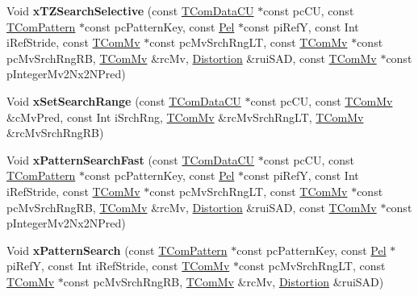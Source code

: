 \begin{DoxyCompactItemize}
\item 
\mbox{\label{class_t_enc_search_acf9bc4cb8abd7f24b58e17d54b583603}} 
Void {\bfseries x\+T\+Z\+Search\+Selective} (const \hyperlink{class_t_com_data_c_u}{T\+Com\+Data\+CU} $\ast$const pc\+CU, const \hyperlink{class_t_com_pattern}{T\+Com\+Pattern} $\ast$const pc\+Pattern\+Key, const \hyperlink{_type_def_8h_af92141699657699b4b547be0c8517541}{Pel} $\ast$const pi\+RefY, const Int i\+Ref\+Stride, const \hyperlink{class_t_com_mv}{T\+Com\+Mv} $\ast$const pc\+Mv\+Srch\+Rng\+LT, const \hyperlink{class_t_com_mv}{T\+Com\+Mv} $\ast$const pc\+Mv\+Srch\+Rng\+RB, \hyperlink{class_t_com_mv}{T\+Com\+Mv} \&rc\+Mv, \hyperlink{_type_def_8h_aed82b23ef6849d0bc3d95c92102d5b50}{Distortion} \&rui\+S\+AD, const \hyperlink{class_t_com_mv}{T\+Com\+Mv} $\ast$const p\+Integer\+Mv2\+Nx2\+N\+Pred)
\item 
\mbox{\label{class_t_enc_search_a613a9bc22519f42bd07b28d51f131707}} 
Void {\bfseries x\+Set\+Search\+Range} (const \hyperlink{class_t_com_data_c_u}{T\+Com\+Data\+CU} $\ast$const pc\+CU, const \hyperlink{class_t_com_mv}{T\+Com\+Mv} \&c\+Mv\+Pred, const Int i\+Srch\+Rng, \hyperlink{class_t_com_mv}{T\+Com\+Mv} \&rc\+Mv\+Srch\+Rng\+LT, \hyperlink{class_t_com_mv}{T\+Com\+Mv} \&rc\+Mv\+Srch\+Rng\+RB)
\item 
\mbox{\label{class_t_enc_search_a1cdc1535c8a268b0d0e573859aeb107d}} 
Void {\bfseries x\+Pattern\+Search\+Fast} (const \hyperlink{class_t_com_data_c_u}{T\+Com\+Data\+CU} $\ast$const pc\+CU, const \hyperlink{class_t_com_pattern}{T\+Com\+Pattern} $\ast$const pc\+Pattern\+Key, const \hyperlink{_type_def_8h_af92141699657699b4b547be0c8517541}{Pel} $\ast$const pi\+RefY, const Int i\+Ref\+Stride, const \hyperlink{class_t_com_mv}{T\+Com\+Mv} $\ast$const pc\+Mv\+Srch\+Rng\+LT, const \hyperlink{class_t_com_mv}{T\+Com\+Mv} $\ast$const pc\+Mv\+Srch\+Rng\+RB, \hyperlink{class_t_com_mv}{T\+Com\+Mv} \&rc\+Mv, \hyperlink{_type_def_8h_aed82b23ef6849d0bc3d95c92102d5b50}{Distortion} \&rui\+S\+AD, const \hyperlink{class_t_com_mv}{T\+Com\+Mv} $\ast$const p\+Integer\+Mv2\+Nx2\+N\+Pred)
\item 
\mbox{\label{class_t_enc_search_a648cca301d76e854c280696164cc7bb8}} 
Void {\bfseries x\+Pattern\+Search} (const \hyperlink{class_t_com_pattern}{T\+Com\+Pattern} $\ast$const pc\+Pattern\+Key, const \hyperlink{_type_def_8h_af92141699657699b4b547be0c8517541}{Pel} $\ast$pi\+RefY, const Int i\+Ref\+Stride, const \hyperlink{class_t_com_mv}{T\+Com\+Mv} $\ast$const pc\+Mv\+Srch\+Rng\+LT, const \hyperlink{class_t_com_mv}{T\+Com\+Mv} $\ast$const pc\+Mv\+Srch\+Rng\+RB, \hyperlink{class_t_com_mv}{T\+Com\+Mv} \&rc\+Mv, \hyperlink{_type_def_8h_aed82b23ef6849d0bc3d95c92102d5b50}{Distortion} \&rui\+S\+AD)

\end{DoxyCompactItemize}
